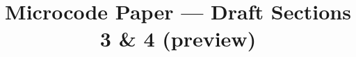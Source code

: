 \documentclass[11pt]{article}
\title{Microcode Paper --- Draft Sections 3 \& 4 (preview)}
\author{}
\date{}
\begin{document}
\maketitle
\tableofcontents
\bigskip


\clearpage

\clearpage

\end{document}
